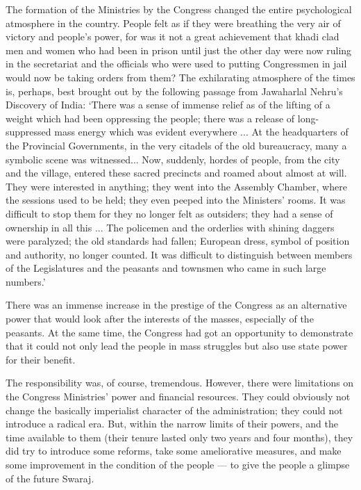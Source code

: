 The formation of the Ministries by the Congress changed the entire psychological atmosphere in the country. People felt as if they were breathing the very air of victory and people's power, for was it not a great achievement that khadi clad men and women who had been in prison until just the other day were now ruling in the secretariat and the officials who were used to putting Congressmen in jail would now be taking orders from them? The exhilarating atmosphere of the times is, perhaps, best brought out by the following passage from Jawaharlal Nehru's Discovery of India: `There was a sense of immense relief as of the lifting of a weight which had been oppressing the people; there was a release of long- suppressed mass energy which was evident everywhere ... At the headquarters of the Provincial Governments, in the very citadels of the old bureaucracy, many a symbolic scene was witnessed... Now, suddenly, hordes of people, from the city and the village, entered these sacred precincts and roamed about almost at will. They were interested in anything; they went into the Assembly Chamber, where the sessions used to be held; they even peeped into the Ministers' rooms. It was difficult to stop them for they no longer felt as outsiders; they had a sense of ownership in all this ... The policemen and the orderlies with shining daggers were paralyzed; the old standards had fallen; European dress, symbol of position and authority, no longer counted. It was difficult to distinguish between members of the Legislatures and the peasants and townsmen who came in such large numbers.' 

There was an immense increase in the prestige of the Congress as an alternative power that would look after the interests of the masses, especially of the peasants. At the same time, the Congress had got an opportunity to demonstrate that it could not only lead the people in mass struggles but also use state power for their benefit. 

The responsibility was, of course, tremendous. However, there were limitations on the Congress Ministries' power and financial resources. They could obviously not change the basically imperialist character of the administration; they could not introduce a radical era. But, within the narrow limits of their powers, and the time available to them (their tenure lasted only two years and four months), they did try to introduce some reforms, take some ameliorative measures, and make some improvement in the condition of the people --- to give the people a glimpse of the future Swaraj. 


